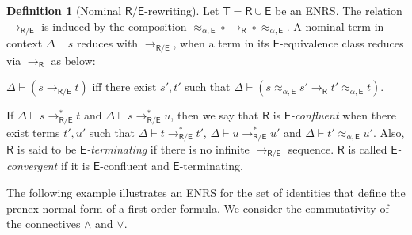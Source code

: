 \documentclass[11pt,a4paper]{amsart}
\newcommand{\daniele}[1]{\textcolor{cyan}{#1}}
\newcommand{\ealeq}{\approx_{\alpha,\theory{E}}}
\newcommand{\alert}[1]{\textcolor{red}{#1}}
\newcommand{\theory}[1]{\ensuremath{\mathsf{#1}}}
\theoremstyle{plain}
\theoremstyle{definition}
\newtheorem{definition}[theorem]{Definition}
\theoremstyle{remark}
\begin{document}
\begin{definition}[Nominal \theory{R/E}-rewriting]\label{def:RE-rewriting}
Let $\theory{T}=\theory{R}{\cup}\theory{E}$ be an ENRS. The relation $\to_\theory{R/E}$ is induced by the composition $\ealeq \circ \to_\theory{R}\circ \ealeq$. A nominal term-in-context $\Delta \vdash s$ reduces with   $\to_{\theory{R/E}}$, when a term in its $\theory{E}$-equivalence class reduces via $\to_{\theory{R}}$ as below:
\begin{center}
$\Delta \vdash (s \to_{\theory{R/E}} t)$ iff there exist $s',t'$ such that $\Delta \vdash (s \ealeq s' \to_\theory{R} t' \ealeq t)$.
\end{center}

If $\Delta \vdash s \to_\theory{R/E}^* t$ and $\Delta \vdash s \to_\theory{R/E}^* u$, then we say  that $\theory{R}$ is \emph{$\theory{E}$-confluent} when there exist terms $t',u'$ such that $\Delta \vdash t \to_\theory{R/E}^* t'$, $\Delta \vdash u \to_\theory{R/E}^* u'$ and $\Delta\vdash t'\ealeq u'$.
Also, $\theory{R}$ is said to be \emph{$\theory{E}$-terminating} if there is no infinite $\to_\theory{R/E}$ sequence.
 $\theory{R}$ is called \emph{$\theory{E}$-convergent} if it is $\theory{E}$-confluent and $\theory{E}$-terminating.
\end{definition}
The following example illustrates an ENRS for the set of identities that define the prenex normal form of a first-order formula. We consider the commutativity of the connectives $\wedge$ and $\vee$.
\end{document}
